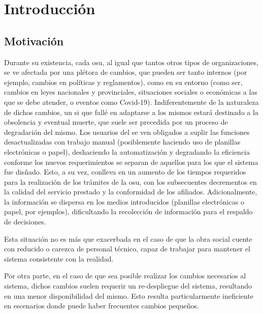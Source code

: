 \chapter{Introducción}


\section{Motivación}


Durante su existencia, cada \acrfull{osu}, al igual que tantos otros tipos de organizaciones, se ve afectada por una plétora de cambios, que pueden ser tanto internos (por ejemplo, cambios en políticas y reglamentos), como en su entorno (como ser, cambios en leyes nacionales y provinciales, situaciones sociales o económicas a las que se debe atender, o eventos como Covid-19).
Indiferentemente de la naturaleza de dichos cambios, un \acrfull{si} que fallé en adaptarse a los mismos estará destinado a la obsolencia y eventual muerte, que suele ser precedida por un proceso de degradación del mismo.
Los usuarios del \SIOSU se ven obligados a suplir las funciones desactualizadas con trabajo manual (posiblemente haciendo uso de planillas electrónicas o papel), deshaciendo la automatización y degradando la eficiencia conforme los nuevos requerimientos se separan de aquellos para los que el sistema fue disñado.
Esto, a su vez, conlleva en un aumento de los tiempos requeridos para la realización de los trámites de la \acrshort{osu}, con los subsecuentes decrementos en la calidad del servicio prestado y la conformidad de los afiliados. Adicionalmente, la información se dispersa en los medios introducidos (planillas electrónicas o papel, por ejemplos), dificultando la recolección de información para el respaldo de decisiones.

Esta situación no es más que exacerbada en el caso de que la obra social cuente con reducido o carezca de personal técnico, capaz de trabajar para mantener el sistema consistente con la realidad.

Por otra parte, en el caso de que sea posible realizar los cambios necesarios al sistema, dichos cambios suelen requerir un re-despliegue del sistema, resultando en una menor disponibilidad del mismo. Esto resulta particularmente ineficiente en escenarios donde puede haber frecuentes cambios pequeños.

